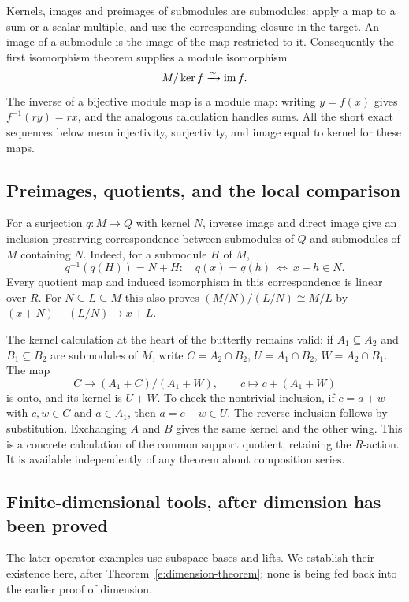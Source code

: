 Kernels, images and preimages of submodules are submodules: apply a map
to a sum or a scalar multiple, and use the corresponding closure in the
target. An image of a submodule is the image of the map restricted to it.
Consequently the first isomorphism theorem supplies a module isomorphism
\[
 M/\operatorname{ker} f\xrightarrow{\sim}\operatorname{im} f.
\]
The inverse of a bijective module map is a module map: writing $y=f(x)$
gives $f^{-1}(ry)=rx$, and the analogous calculation handles sums.
All the short exact sequences below mean injectivity, surjectivity, and
image equal to kernel for these maps.

\subsection{Preimages, quotients, and the local comparison}

For a surjection $q:M\to Q$ with kernel $N$, inverse image and direct
image give an inclusion-preserving correspondence
between submodules of $Q$ and submodules of $M$ containing $N$.
Indeed, for a submodule $H$ of $M$,
\[
 q^{-1}(q(H))=N+H:
 \quad q(x)=q(h)\ \Longleftrightarrow\ x-h\in N.
\]
Every quotient map and induced isomorphism in this correspondence is
linear over $R$. For $N\subseteq L\subseteq M$ this also proves
$(M/N)/(L/N)\cong M/L$ by $(x+N)+(L/N)\mapsto x+L$.

The kernel calculation at the heart of the butterfly remains valid:
if $A_1\subseteq A_2$ and $B_1\subseteq B_2$ are submodules of $M$,
write $C=A_2\cap B_2$, $U=A_1\cap B_2$, $W=A_2\cap B_1$.
The map
\[
 C\longrightarrow (A_1+C)/(A_1+W),\qquad c\longmapsto c+(A_1+W)
\]
is onto, and its kernel is $U+W$. To check the nontrivial inclusion,
if $c=a+w$ with $c,w\in C$ and $a\in A_1$, then $a=c-w\in U$.
The reverse inclusion follows by substitution. Exchanging $A$ and $B$
gives the same kernel and the other wing. This is a concrete calculation
of the common support quotient, retaining the $R$-action. It is available independently
of any theorem about composition series.

\subsection{Finite-dimensional tools, after dimension has been proved}
\label{m:finite-tools}

The later operator examples use subspace bases and lifts. We establish
their existence here, after Theorem~\ref{e:dimension-theorem}; none is
being fed back into the earlier proof of dimension.

